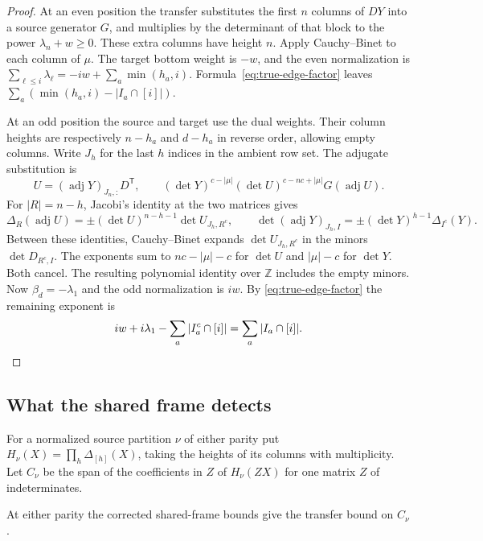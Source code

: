 \begin{proof}
At an even position the transfer substitutes the first $n$ columns of
$DY$ into a source generator $G$, and multiplies by the determinant
of that block to the power $\lambda_n+w\ge0$. These extra columns
have height $n$. Apply Cauchy--Binet to each column of $\mu$.
The target bottom weight is $-w$, and the even normalization is
$\sum_{\ell\le i}\lambda_\ell=-iw+\sum_a\min(h_a,i)$.
Formula~\eqref{eq:true-edge-factor} leaves
$\sum_a(\min(h_a,i)-|I_a\cap[i]|)$.

At an odd position the source and target use the dual weights.
Their column heights are respectively $n-h_a$ and $d-h_a$ in reverse
order, allowing empty columns. Write $J_h$ for the last $h$ indices
in the ambient row set. The adjugate substitution is \citep{alpoge-local-symbol}
\[
 U=(\operatorname{adj}Y)_{J_n,:}D^{\mathsf T},\qquad
 (\det Y)^{c-|\mu|}(\det U)^{c-nc+|\mu|}G(\operatorname{adj}U).
\]
For $|R|=n-h$, Jacobi's identity at the two matrices gives
\[
 \Delta_R(\operatorname{adj}U)
 =\pm(\det U)^{n-h-1}\det U_{J_h,R^c},\qquad
 \det(\operatorname{adj}Y)_{J_h,I}
 =\pm(\det Y)^{h-1}\Delta_{I^c}(Y).
\]
Between these identities, Cauchy--Binet expands $\det U_{J_h,R^c}$
in the minors $\det D_{R^c,I}$.
The exponents sum to $nc-|\mu|-c$ for $\det U$ and $|\mu|-c$
for $\det Y$. Both cancel. The resulting polynomial identity over
$\mathbb Z$ includes the empty minors.
Now $\beta_d=-\lambda_1$ and the odd normalization is $iw$. By
\eqref{eq:true-edge-factor} the remaining exponent is
\[
 iw+i\lambda_1-\sum_a|I_a^c\cap[i]|=\sum_a|I_a\cap[i]| .\qedhere
\]
\end{proof}

\subsection{What the shared frame detects}

For a normalized source partition $\nu$ of either parity put
$H_\nu(X)=\prod_{h}\Delta_{[h]}(X)$, taking the heights of its
columns with multiplicity. Let $C_\nu$ be the span of the
coefficients in $Z$ of $H_\nu(ZX)$ for one matrix $Z$ of indeterminates.

\begin{lemma}\label{lem:true-common-frame}
At either parity the corrected shared-frame bounds give the transfer
bound on $C_\nu$.
\end{lemma}


